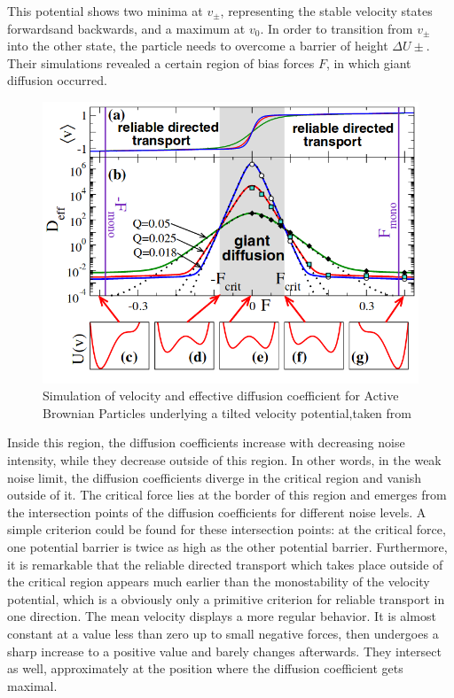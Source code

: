 \documentclass[12pt,a4paper]{article}
\begin{document}
This potential shows two minima at $v_\pm$, representing the stable velocity states \glqq forwards\grqq and \glqq backwards\grqq, and a maximum at $v_0$. In order to transition from $v_\pm$ into the other state, the particle needs to overcome a barrier of height $\Delta U\pm$.  
\\
Their simulations revealed a certain region of bias forces $F$, in which giant diffusion occurred.
\begin{figure}[H]
	\centering
	\includegraphics[scale=0.5]{mess08.png}\caption{Simulation of velocity and effective diffusion coefficient for Active Brownian Particles underlying a tilted velocity potential,taken from \cite{abp}}
	\label{abpsim}
\end{figure}
Inside this region, the diffusion coefficients increase with decreasing noise intensity, while they decrease outside of this region. In other words, in the weak noise limit, the diffusion coefficients diverge in the critical region and vanish outside of it. The critical force lies at the border of this region and emerges from the intersection points of the diffusion coefficients for different noise levels. A simple criterion could be found for these intersection points: at the critical force, one potential barrier is twice as high as the other potential barrier. 
Furthermore, it is remarkable that the reliable directed transport which takes place outside of the critical region appears much earlier than the monostability of the velocity potential, which is a obviously only a primitive criterion for reliable transport in one direction. 
The mean velocity displays a more regular behavior. It is almost constant at a value less than zero up to small negative forces, then undergoes a sharp increase to a positive value and barely changes afterwards. They intersect as well, approximately at the position where the diffusion coefficient gets maximal.
\end{document}
